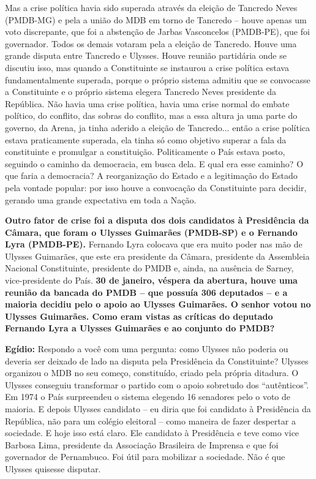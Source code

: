 Mas a crise política havia sido superada através da eleição de Tancredo
Neves (PMDB-MG) e pela a união do MDB em torno de Tancredo -- houve
apenas um voto discrepante, que foi a abstenção de Jarbas Vasconcelos
(PMDB-PE), que foi governador. Todos os demais votaram pela a eleição de
Tancredo. Houve uma grande disputa entre Tancredo e Ulysses. Houve
reunião partidária onde se discutiu isso, mas quando a Constituinte se
instaurou a crise política estava fundamentalmente superada, porque o
próprio sistema admitiu que se convocasse a Constituinte e o próprio
sistema elegera Tancredo Neves presidente da República. Não havia uma
crise política, havia uma crise normal do embate político, do conflito,
das sobras do conflito, mas a essa altura ja uma parte do governo, da
Arena, ja tinha aderido a eleição de Tancredo... então a crise política
estava praticamente superada, ela tinha só como objetivo superar a fala
da constituinte e promulgar a constituição. Politicamente o País estava
posto, seguindo o caminho da democracia, em busca dela. E qual era esse
caminho? O que faria a democracia? A reorganização do Estado e a
legitimação do Estado pela vontade popular: por isso houve a convocação
da Constituinte para decidir, gerando uma grande expectativa em toda a
Nação.

\textbf{Outro fator de crise foi a disputa dos dois candidatos à
Presidência da Câmara, que foram o Ulysses Guimarães (PMDB-SP) e o
Fernando Lyra (PMDB-PE).} Fernando Lyra colocava que era muito poder nas
mão de Ulysses Guimarães, que este era presidente da Câmara, presidente
da Assembleia Nacional Constituinte, presidente do PMDB e, ainda, na
ausência de Sarney, vice-presidente do País. \textbf{30 de janeiro,
véspera da abertura, houve uma reunião da bancada do PMDB -- que possuía
306 deputados -- e a maioria decidiu pelo o apoio ao Ulysses Guimarães.
O senhor votou no Ulysses Guimarães. Como eram vistas as críticas do
deputado Fernando Lyra a Ulysses Guimarães e ao conjunto do PMDB?}

\textbf{Egídio:} Respondo a você com uma pergunta: como Ulysses não
poderia ou deveria ser deixado de lado na disputa pela Presidência da
Constituinte? Ulysses organizou o MDB no seu começo, constituído, criado
pela própria ditadura. O Ulysses conseguiu transformar o partido com o
apoio sobretudo dos ``autênticos''. Em 1974 o País surpreendeu o sistema
elegendo 16 senadores pelo o voto de maioria. E depois Ulysses candidato
-- eu diria que foi candidato à Presidência da República, não para um
colégio eleitoral -- como maneira de fazer despertar a sociedade. E hoje
isso está claro. Ele candidato à Presidência e teve como vice Barbosa
Lima, presidente da Associação Brasileira de Imprensa e que foi
governador de Pernambuco. Foi útil para mobilizar a sociedade. Não é que
Ulysses quisesse disputar.

